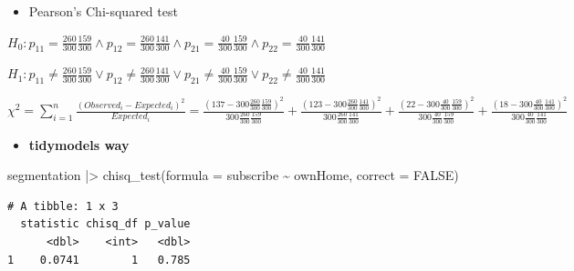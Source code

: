 \documentclass[
  ignorenonframetext,
]{beamer}
\newenvironment{Shaded}{\begin{snugshade}}{\end{snugshade}}
\newcommand{\AttributeTok}[1]{\textcolor[rgb]{0.40,0.45,0.13}{#1}}
\newcommand{\ConstantTok}[1]{\textcolor[rgb]{0.56,0.35,0.01}{#1}}
\newcommand{\FunctionTok}[1]{\textcolor[rgb]{0.28,0.35,0.67}{#1}}
\newcommand{\NormalTok}[1]{\textcolor[rgb]{0.00,0.23,0.31}{#1}}
\newcommand{\SpecialCharTok}[1]{\textcolor[rgb]{0.37,0.37,0.37}{#1}}
\providecommand{\tightlist}{%
  \setlength{\itemsep}{0pt}\setlength{\parskip}{0pt}}\usepackage{longtable,booktabs,array}
\begin{document}
\begin{frame}[fragile]{}
\label{section-9}
\begin{itemize}
\tightlist
\item
  Pearson's Chi-squared test
\end{itemize}

\(H_0: p_{11} = \frac{260}{300}\frac{159}{300} \land p_{12} = \frac{260}{300}\frac{141}{300} \land p_{21} = \frac{40}{300}\frac{159}{300} \land p_{22} = \frac{40}{300}\frac{141}{300}\)

\(H_1: p_{11} \neq \frac{260}{300}\frac{159}{300} \lor p_{12} \neq \frac{260}{300}\frac{141}{300} \lor p_{21} \neq \frac{40}{300}\frac{159}{300} \lor p_{22} \neq \frac{40}{300}\frac{141}{300}\)

\(\chi^2 = \sum_{i=1}^n \frac{(Observed_i - Expected_i)^2}{Expected_i} = \frac{(137 - 300\frac{260}{300}\frac{159}{300})^2}{300\frac{260}{300}\frac{159}{300}} + \frac{(123 - 300\frac{260}{300}\frac{141}{300})^2}{300\frac{260}{300}\frac{141}{300}} + \frac{(22 - 300\frac{40}{300}\frac{159}{300})^2}{300\frac{40}{300}\frac{159}{300}} + \frac{(18 - 300\frac{40}{300}\frac{141}{300})^2}{300\frac{40}{300}\frac{141}{300}}\)

\begin{itemize}
\tightlist
\item
  \textbf{tidymodels way}
\end{itemize}

\tiny

\begin{Shaded}
\begin{Highlighting}[]
\NormalTok{segmentation }\SpecialCharTok{|\textgreater{}} 
  \FunctionTok{chisq\_test}\NormalTok{(}\AttributeTok{formula =}\NormalTok{ subscribe }\SpecialCharTok{\textasciitilde{}}\NormalTok{ ownHome, }
           \AttributeTok{correct =} \ConstantTok{FALSE}\NormalTok{)}
\end{Highlighting}
\end{Shaded}

\begin{verbatim}
# A tibble: 1 x 3
  statistic chisq_df p_value
      <dbl>    <int>   <dbl>
1    0.0741        1   0.785
\end{verbatim}
\end{frame}
\end{document}
